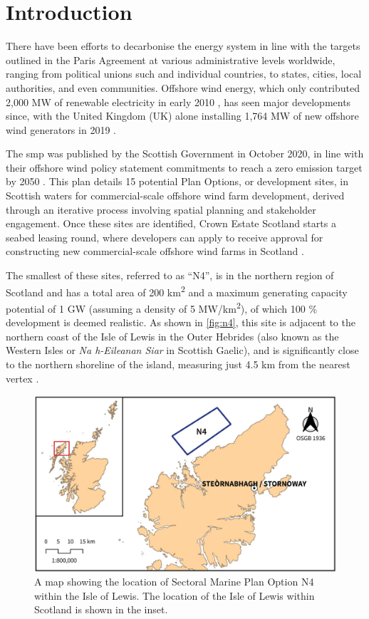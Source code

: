 \chapter{Introduction}

There have been efforts to decarbonise the energy system in line with the targets outlined in the Paris Agreement at various administrative levels worldwide, ranging from political unions such and individual countries, to states, cities, local authorities, and even communities. Offshore wind energy, which only contributed 2,000 MW of renewable electricity in early 2010 \autocite{esteban2011}, has seen major developments since, with the United Kingdom (UK) alone installing 1,764 MW of new offshore wind generators in 2019 \autocite{windeurope2020}.

The \gls{smp} was published by the Scottish Government in October 2020, in line with their offshore wind policy statement commitments to reach a zero emission target by 2050 \autocite{govscot-smp}. This plan details 15 potential Plan Options, or development sites, in Scottish waters for commercial-scale offshore wind farm development, derived through an iterative process involving spatial planning and stakeholder engagement. Once these sites are identified, Crown Estate Scotland starts a seabed leasing round, where developers can apply to receive approval for constructing new commercial-scale offshore wind farms in Scotland \autocite{crownestate}.

The smallest of these sites, referred to as ``N4'', is in the northern region of Scotland and has a total area of 200 km\textsuperscript{2} and a maximum generating capacity potential of 1 GW (assuming a density of 5 MW/km\textsuperscript{2}), of which 100 \% development is deemed realistic. As shown in \autoref{fig:n4}, this site is adjacent to the northern coast of the Isle of Lewis in the Outer Hebrides (also known as the Western Isles or \textit{Na h-Eileanan Siar} in Scottish Gaelic), and is significantly close to the northern shoreline of the island, measuring just 4.5 km from the nearest vertex \autocite{naturescot-smp}.

\begin{figure}
  \centering
  \includegraphics{images/maps/overview}
  \caption{A map showing the location of Sectoral Marine Plan Option N4 within the Isle of Lewis. The location of the Isle of Lewis within Scotland is shown in the inset. \label{fig:n4}}
\end{figure}

